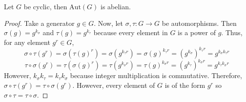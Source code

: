 \documentclass[12pt]{extarticle}
\begin{document}
\begin{lemma} \label{abelian}
Let $G$ be cyclic, then $\mathrm{Aut}(G)$ is abelian.
\end{lemma}
\begin{proof}
Take a generator $g \in G$. Now, let $\sigma, \tau : G \to G$ be automorphisms. Then $\sigma(g) = g^{k_\sigma}$ and $\tau(g) = g^{k_\tau}$ because every element in $G$ is a power of $g$. Thus, for any element $g^r \in G$,
\[\sigma \circ \tau(g^r) = \sigma(\tau(g)^r) = \sigma(g^{k_\tau r}) = \sigma(g)^{k_\tau r} = (g^{k_\sigma})^{k_\tau r} = g^{k_\sigma k_\tau r}\] 
\[\tau \circ \sigma(g^r) = \tau(\sigma(g)^r) = \tau(g^{k_\sigma r}) = \tau(g)^{k_\sigma r} = (g^{k_\tau})^{k_\sigma r} = g^{k_\tau k_\sigma r}\] 
However, $k_\sigma k_\tau = k_\tau k_\sigma$ because integer multiplication is commutative. Therefore, $\sigma \circ \tau(g^r) = \tau \circ \sigma(g^r)$. However, every element of $G$ is of the form $g^r$ so $\sigma \circ \tau = \tau \circ \sigma$. 
\end{proof}
\end{document}
